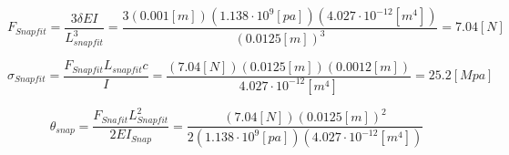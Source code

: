\documentclass[../main.tex]{subfiles}
\begin{document}
\begin{equation*}
F_{Snapfit} = \frac{3 \delta E I}{L_{snapfit}^3} = \frac{3 (0.001[m]) (1.138\cdot 10^9 [pa]) (4.027\cdot 10^{-12}[m^4])}{(0.0125[m])^3} = 7.04[N]
\end{equation*}

\begin{equation*}
\sigma_{Snapfit} = \frac{F_{Snapfit} L_{snapfit} c}{I} = \frac{(7.04[N]) (0.0125[m]) (0.0012[m])}{4.027\cdot 10^{-12}[m^4]} = 25.2[Mpa]
\end{equation*}

\begin{equation*}
\theta_{snap} = \frac{F_{Snafit}L_{Snapfit}^2}{2EI_{Snap}} = \frac{(7.04[N])(0.0125[m])^2}{2(1.138\cdot 10^9 [pa]) (4.027\cdot 10^{-12}[m^4])}   
\end{equation*}
\end{document}
